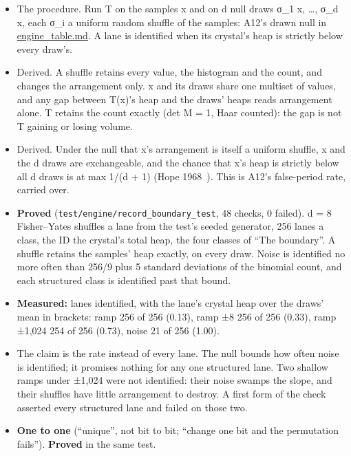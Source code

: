 \begin{itemize}
\begin{itemize}
\item The procedure. Run T on the samples x and on d null draws σ\_\allowbreak{}1 x, …, σ\_\allowbreak{}d x, each σ\_\allowbreak{}i a uniform random shuffle of the samples: A12's drawn null in \hyperref[chap:engine-table]{engine\_\allowbreak{}table.md}. A lane is identified when its crystal's heap is strictly below every draw's.
\item Derived. A shuffle retains every value, the histogram and the count, and changes the arrangement only. x and its draws share one multiset of values, and any gap between T(x)'s heap and the draws' heaps reads arrangement alone. T retains the count exactly (det M = 1, Haar counted): the gap is not T gaining or losing volume.
\item Derived. Under the null that x's arrangement is itself a uniform shuffle, x and the d draws are exchangeable, and the chance that x's heap is strictly below all d draws is at max 1/(d + 1) (Hope 1968~\cite{src:Hope-1968}). This is A12's false-period rate, carried over.
\item \textbf{Proved} (\texttt{test/\allowbreak{}engine/\allowbreak{}record\_\allowbreak{}boundary\_\allowbreak{}test}, 48 checks, 0 failed). d = 8 Fisher–Yates shuffles a lane from the test's seeded generator, 256 lanes a class, the ID the crystal's total heap, the four classes of “The boundary”. A shuffle retains the samples' heap exactly, on every draw. Noise is identified no more often than 256/9 plus 5 standard deviations of the binomial count, and each structured class is identified past that bound.
\item \textbf{Measured:} lanes identified, with the lane's crystal heap over the draws' mean in brackets: ramp 256 of 256 (0.13), ramp ±8 256 of 256 (0.33), ramp ±1,024 254 of 256 (0.73), noise 21 of 256 (1.00).
\item The claim is the rate instead of every lane. The null bounds how often noise is identified; it promises nothing for any one structured lane. Two shallow ramps under ±1,024 were not identified: their noise swamps the slope, and their shuffles have little arrangement to destroy. A first form of the check asserted every structured lane and failed on those two.
\item \textbf{One to one} (“unique”, not bit to bit; “change one bit and the permutation fails”). \textbf{Proved} in the same test.


\end{itemize}
\end{itemize}
